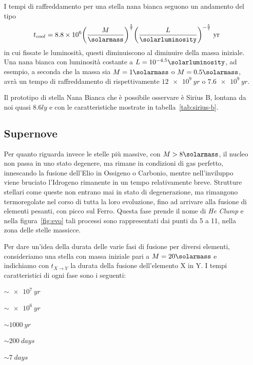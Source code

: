 I tempi di raffreddamento per una stella nana bianca seguono un andamento del tipo
\begin{equation}
    t_{cool} = 8.8\times 10^6 {\left(\frac{M}{\si{\solarmass}} \right)}^{\frac{5}{7}} {\left( \frac{L}{\si{\solarluminosity}} \right)}^{-\frac{5}{7}} \mbox{ yr}
\end{equation}
in cui fissate le luminosità, questi diminuiscono al diminuire della massa iniziale. Una nana bianca con luminosità costante a $L = 10^{-4.5} \si{\solarluminosity}$, ad esempio, a seconda che la massa sia $M = 1\si{\solarmass}$ o $M = 0.5 \si{\solarmass}$, avrà un tempo di raffreddamento di rispettivamente $\SI{12e9}{yr}$ o $\SI{7.6e9}{yr}$.

Il prototipo di stella Nana Bianca che è possibile osservare è Sirius B, lontana da noi quasi $8.6 \si{ly}$ e con le caratteristiche mostrate in tabella~\ref{tab:sirius-b}.

\subsection{Supernove}\label{sec:supernove}
Per quanto riguarda invece le stelle più massive, con $M > 8 \si{\solarmass}$, il nucleo non passa in uno stato degenere, ma rimane in condizioni di gas perfetto, innescando la fusione dell'Elio in Ossigeno o Carbonio, mentre nell'inviluppo viene bruciato l'Idrogeno rimanente in un tempo relativamente breve. Strutture stellari come queste non entrano mai in stato di degenerazione, ma rimangono termoregolate nel corso di tutta la loro evoluzione, fino ad arrivare alla fusione di elementi pesanti, con picco sul Ferro. Questa fase prende il nome di \textit{He Clump} e nella figura~\ref{fig:evo} tali processi sono rappresentati dai punti da 5 a 11, nella zona delle stelle massicce.

Per dare un'idea della durata delle varie fasi di fusione per diversi elementi, consideriamo una stella con massa iniziale pari a $M = 20\si{\solarmass}$ e indichiamo con $t_{X \rightarrow Y}$ la durata della fusione dell'elemento X in Y. I tempi caratteristici di ogni fase sono i seguenti:
\begin{description}
    \centering
    \item[$t_{H \rightarrow He}$] $\sim \SI{e7}{yr}$
    \item[$t_{He \rightarrow C}$] $\sim \SI{e6}{yr}$
    \item[$t_{C \rightarrow O}$] $\sim \SI{1000}{yr}$
    \item[$t_{O}$] $\sim \SI{200}{days}$
    \item[$t_{Si}$] $\sim \SI{7}{days}$
\end{description}

